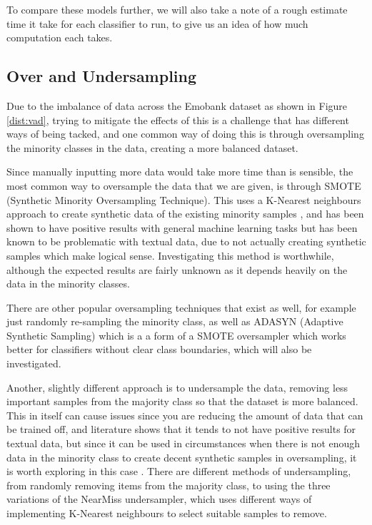 To compare these models further, we will also take a note of a rough estimate time it take for each classifier to run, to give us an idea of how much computation each takes.

\subsection{Over and Undersampling}

Due to the imbalance of data across the Emobank dataset as shown in Figure \ref{dist:vad}, trying to mitigate the effects of this is a challenge that has different ways of being tacked, and one common way of doing this is through oversampling the minority classes in the data, creating a more balanced dataset. \cite{towardsDS}

Since manually inputting more data would take more time than is sensible, the most common way to oversample the data that we are given, is through SMOTE (Synthetic Minority Oversampling Technique). This uses a K-Nearest neighbours approach to create synthetic data of the existing minority samples , and has been shown to have positive results with general machine learning tasks but has been known to be problematic with textual data, due to not actually creating synthetic samples which make logical sense. Investigating this method is worthwhile, although the expected results are fairly unknown as it depends heavily on the data in the minority classes.

There are other popular oversampling techniques that exist as well, for example just randomly re-sampling the minority class, as well as ADASYN (Adaptive Synthetic Sampling) which is a a form of a SMOTE oversampler which works better for classifiers without clear class boundaries, which will also be investigated.

Another, slightly different approach is to undersample the data, removing less important samples from the majority class so that the dataset is more balanced. This in itself can cause issues since you are reducing the amount of data that can be trained off, and literature shows that it tends to not have positive results for textual data, but since it can be used in circumstances when there is not enough data in the minority class to create decent synthetic samples in oversampling, it is worth exploring in this case \cite{more2016survey}. There are different methods of undersampling, from randomly removing items from the majority class, to using the three variations of the NearMiss undersampler, which uses different ways of implementing K-Nearest neighbours to select suitable samples to remove. 

